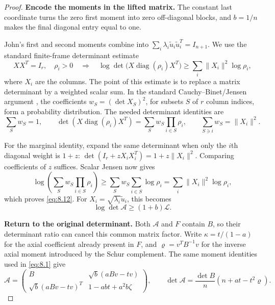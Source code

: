\begin{proof}
\textbf{Encode the moments in the lifted matrix.} The constant last
coordinate turns the zero first moment into zero off-diagonal blocks, and
$b=1/n$ makes the final diagonal entry equal to one.

John's first and second moments combine into $\sum_i\lambda_i\widetilde u_i\widetilde u_i^T=I_{n+1}$. We use the standard finite-frame determinant estimate
\begin{equation}\label{eq:8.12}
XX^T=I_r,\quad \rho_i>0
\quad\Longrightarrow\quad
\log\det\bigl(X\operatorname{diag}(\rho_i)X^T\bigr)
\ge\sum_i\|X_i\|^2\log\rho_i,
\end{equation}
where $X_i$ are the columns. The point of this estimate is to replace a matrix
determinant by a weighted scalar sum. In the standard Cauchy--Binet/Jensen
argument \cite{HJ1985,BV2004}, the coefficients $w_S=(\det X_S)^2$, for subsets
$S$ of $r$ column indices, form a probability distribution. The needed
determinant identities are
\begin{equation}\label{eq:8.13}
\sum_S w_S=1,\qquad
\det(X\operatorname{diag}(\rho_i)X^T)=\sum_Sw_S\prod_{i\in S}\rho_i,
\qquad \sum_{S\ni i}w_S=\|X_i\|^2.
\end{equation}

For the marginal identity, expand the same determinant when only the $i$th diagonal weight is $1+z$:
$\det(I_r+zX_iX_i^T)=1+z\|X_i\|^2$.
Comparing coefficients of $z$ suffices. Scalar Jensen now gives
\begin{equation}\label{eq:8.14}
\log\!\left(\sum_Sw_S\prod_{i\in S}\rho_i\right)
\ge\sum_Sw_S\sum_{i\in S}\log\rho_i
=\sum_i\|X_i\|^2\log\rho_i,
\end{equation}
which proves \eqref{eq:8.12}. For $X_i=\sqrt{\lambda_i}\widetilde u_i$, this becomes
\begin{equation}\label{eq:8.15}
\log\det\mathcal A\ge(1+b)\mathcal L.
\end{equation}

\textbf{Return to the original determinant.} Both $\mathcal A$ and $F$ contain
$B$, so their determinant ratio can cancel this common matrix factor.
Write $\kappa=t/(1-a)$ for the axial coefficient already present in $F$,
and $\varrho=v^TB^{-1}v$ for the inverse axial moment introduced by the
Schur complement. The same moment identities used in \eqref{eq:8.1} give
\begin{equation}\label{eq:8.16}
\mathcal A=
\begin{pmatrix}
B&\sqrt b(aBv-tv)\\
\sqrt b(aBv-tv)^T&1-abt+a^2b\zeta
\end{pmatrix},
\qquad
\det\mathcal A=\frac{\det B}{n}(n+at-t^2\varrho).
\end{equation}


\end{proof}
